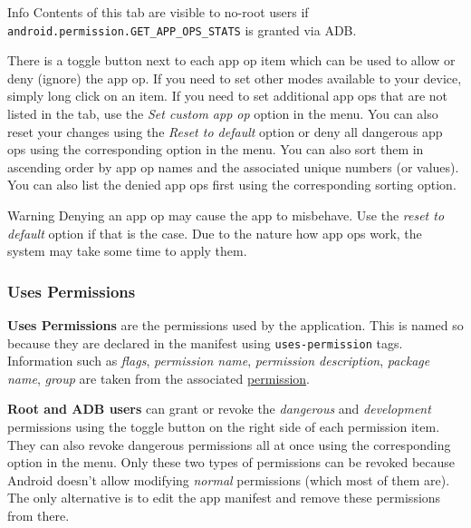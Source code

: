 \begin{tip}{Info}
    Contents of this tab are visible to no-root users if \texttt{android.permission.GET\_APP\_OPS\_STATS} is granted via ADB\@.
\end{tip}

There is a toggle button next to each app op item which can be used to allow or deny (ignore) the app op.
If you need to set other modes available to your device, simply long click on an item.
If you need to set additional app ops that are not listed in the tab, use the \textit{Set custom app op} option in the menu.
You can also reset your changes using the \textit{Reset to default} option or deny all dangerous app ops using the
corresponding option in the menu.
You can also sort them in ascending order by app op names and the associated unique numbers (or values).
You can also list the denied app ops first using the corresponding sorting option.

\begin{warning}{Warning}
    Denying an app op may cause the app to misbehave.
    Use the \textit{reset to default} option if that is the case.
    Due to the nature how app ops work, the system may take some time to apply them.
\end{warning}


\subsubsection{Uses Permissions} %
\textbf{Uses Permissions} are the permissions used by the application. This is named so because they are declared in the
manifest using \texttt{uses-permission} tags. Information such as \textit{flags}, \textit{permission name},
\textit{permission description}, \textit{package name}, \textit{group} are taken from the associated
\hyperref[subsubsec:permissions]{permission}.

\textbf{Root and ADB users} can grant or revoke the \textit{dangerous} and \textit{development} permissions using
the toggle button on the right side of each permission item. They can also revoke dangerous permissions all at once
using the corresponding option in the menu. Only these two types of permissions can be revoked because Android doesn't
allow modifying \textit{normal} permissions (which most of them are). The only alternative is to edit the app manifest
and remove these permissions from there.

